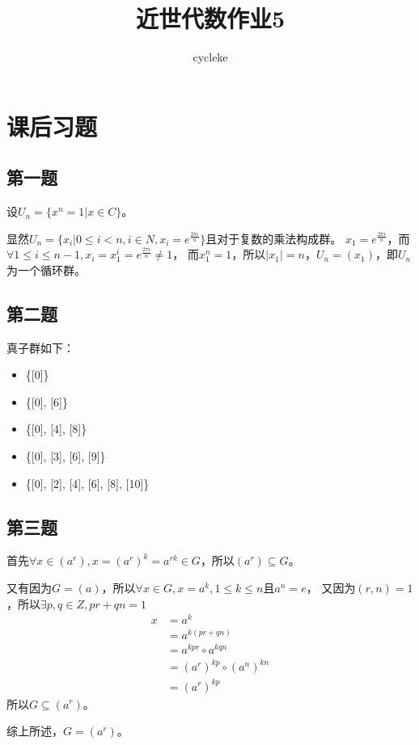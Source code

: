 \documentclass[12pt,onecolumn]{article}
\title{近世代数作业5}
\author{cycleke}
\theoremstyle{plain}
\begin{document}
\maketitle
\tableofcontents
\clearpage

\section{课后习题}

\subsection{第一题}

\begin{proof*}
  设$U_n = \{x^n = 1| x \in C\}$。

  显然$U_n = \{x_i | 0 \leq i < n, i \in N, x_i = e^\frac{2\pi i}{n} \}$且对于复数的乘法构成群。
  $x_1 = e^\frac{2\pi i}{n}$，而$\forall 1 \leq i \leq n - 1, x_i = x_1^i = e^\frac{2\pi i}{n} \neq 1$，
  而$x_1^n = 1$，所以$|x_1| = n$，$U_n = (x_1)$，即$U_n$为一个循环群。
\end{proof*}

\subsection{第二题}
真子群如下：
\begin{itemize}
\item \{[0]\}
\item \{[0], [6]\}
\item \{[0], [4], [8]\}
\item \{[0], [3], [6], [9]\}
\item \{[0], [2], [4], [6], [8], [10]\}
\end{itemize}

\subsection{第三题}
\begin{proof*}
  首先$\forall x \in (a^r), x = {(a^r)}^k = a^{rk} \in G$，所以$(a^r) \subseteq G$。

  又有因为$G = (a)$，所以$\forall x \in G, x = a^k, 1 \leq k \leq n \text{且} a^n = e$，
  又因为$(r, n) = 1$，所以$\exists p, q \in Z, pr + qn = 1$
  \begin{align*}
    x &= a^k \\
      &= a^{k(pr + qn)} \\
      &= a^{kpr} \circ a^{kqn} \\
      &= {(a^r)}^{kp} \circ {(a^n)}^{kn} \\
      &= {(a^r)}^{kp}
  \end{align*}
  所以$G \subseteq (a^r)$。

  综上所述，$G = (a^r)$。
\end{proof*}
\end{document}
